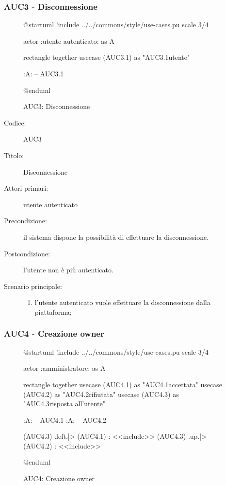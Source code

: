 \documentclass[../analisi-dei-requisiti.tex]{subfiles}
\begin{document}
\subsubsection{AUC3 - Disconnessione}%
\label{subsub:AUC3}

\begin{figure}[h!]
  \centering
  \begin{plantuml}
  @startuml
  !include ../../commons/style/use-cases.pu
  scale 3/4

  actor :utente autenticato: as A

  rectangle {
    together {
      usecase (AUC3.1) as "AUC3.1\nDisconnessione utente"
    }
  }

  :A: -- AUC3.1

  @enduml
  \end{plantuml}
  \caption{AUC3: Disconnessione}
  \label{fig:auc3}
\end{figure}

\begin{description}
  \item[Codice:] AUC3
  \item[Titolo:] Disconnessione
  \item[Attori primari:] utente autenticato
  \item[Precondizione:] il sistema dispone la possibilità di effettuare la disconnessione.
  \item[Postcondizione:] l'utente non è più autenticato.
  \item[Scenario principale:]
  \begin{enumerate}
    \item l'utente autenticato vuole effettuare la disconnessione dalla piattaforma;
  \end{enumerate}
\end{description}

\subsubsection{AUC4 - Creazione owner}%
\label{subsub:AUC4}

\begin{figure}[h!]
  \centering
  \begin{plantuml}
  @startuml
  !include ../../commons/style/use-cases.pu
  scale 3/4

  actor :amministratore: as A

  rectangle {
    together {
      usecase (AUC4.1) as "AUC4.1\nRichiesta accettata"
      usecase (AUC4.2) as "AUC4.2\nRichiesta rifiutata"
    }
    usecase (AUC4.3) as "AUC4.3\nInvio risposta all'utente"
  }

  :A: -- AUC4.1
  :A: -- AUC4.2

  (AUC4.3) .left.|> (AUC4.1) : <<include>>
  (AUC4.3) .up.|> (AUC4.2) : <<include>>

  @enduml
  \end{plantuml}
  \caption{AUC4: Creazione owner}
  \label{fig:AUC4}
\end{figure}
\end{document}
